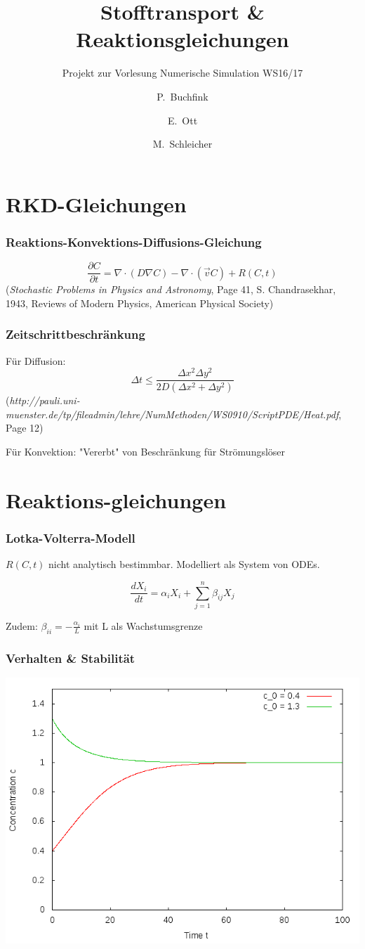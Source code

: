 \documentclass[12pt]{beamer}
\title{Stofftransport \& Reaktionsgleichungen}
\subtitle{Projekt zur Vorlesung Numerische Simulation WS16/17}
\author{P.~Buchfink\inst{1} \and E.~Ott\inst{1} \and M.~Schleicher\inst{1}}
\institute
{
  \inst{1}
  Institut \\
  Universität Stuttgart
}
\begin{document}
  \begin{frame}
    \titlepage
  \end{frame}

  \section{RKD-Gleichungen}
    \begin{frame}
      \frametitle{Reaktions-Konvektions-Diffusions-Gleichung}
      $$\frac{\partial C}{\partial t} = \nabla \cdot (D \nabla C) - \nabla \cdot (\vec{v} C) + R(C,t)$$
      {\tiny (\emph{Stochastic Problems in Physics and Astronomy}, Page 41, S. Chandrasekhar, 1943, Reviews of Modern Physics, American Physical Society)}
    \end{frame}

    \begin{frame}
      \frametitle{Zeitschrittbeschränkung}
      Für Diffusion:
      $$\Delta t \leq \frac{\Delta x^2 \Delta y^2}{2D(\Delta x^2 + \Delta y^2)}$$
      {\tiny (\emph{http://pauli.uni-muenster.de/tp/fileadmin/lehre/NumMethoden/WS0910/ScriptPDE/Heat.pdf}, Page 12)}
      
      Für Konvektion: "Vererbt" von Beschränkung für Strömungslöser
    \end{frame}

  \section{Reaktions-gleichungen}
    \begin{frame}
    \frametitle{Lotka-Volterra-Modell}
    $R(C,t)$ nicht analytisch bestimmbar. Modelliert als System von ODEs.
    
    $$\frac{dX_i}{dt} = \alpha_i X_i + \sum_{j=1}^{n} \beta_{ij} X_j$$
    
    Zudem: $\beta_{ii} = -\frac{\alpha_i}{L}$ mit L als Wachstumsgrenze
    \end{frame}
    
    \begin{frame}
    \frametitle{Verhalten \& Stabilität}
    \includegraphics[scale=0.5]{n1_anfangsbedingungen.png}
    \end{frame}
    
\end{document}
